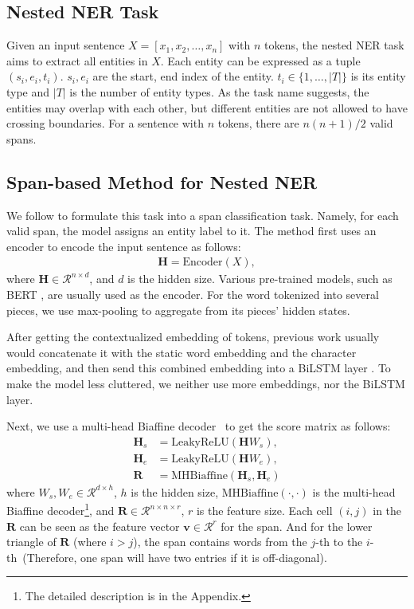 \documentclass[11pt]{article}
\begin{document}
\subsection{Nested NER Task}
Given an input sentence $X=[x_1, x_2, \ldots, x_n]$ with $n$ tokens, 
the nested NER task aims to extract all entities in $X$. Each entity can be expressed as a tuple $(s_i, e_i, t_i)$. $s_i, e_i$ are the start, end index of the entity. $t_i \in \{1, \ldots, |T|\}$ is its entity type and $|T|$ is the number of entity types. 
As the task name suggests, the entities may overlap with each other, but different entities are not allowed to have crossing boundaries. For a sentence with $n$ tokens, there are $n(n+1)/2$ valid spans. 

\subsection{Span-based Method for Nested NER}
We follow \citet{DBLP:conf/acl/YuBP20} to formulate this task into a span classification task. Namely, for each valid span, the model assigns an entity label to it. The method first uses an encoder to encode the input sentence as follows:
\begin{align}
  \mathbf{H} = \mathrm{Encoder}(X), \nonumber
\end{align}
where $\mathbf{H} \in \mathcal{R}^{n \times d}$, and $d$ is the hidden size. Various pre-trained models, such as BERT \cite{DBLP:conf/naacl/DevlinCLT19}, are usually used as the encoder. For the word tokenized into several pieces, we use max-pooling to aggregate from its pieces' hidden states.

After getting the contextualized embedding of tokens, previous work usually would concatenate it with the static word embedding and the character embedding, and then send this combined embedding into a BiLSTM layer \cite{DBLP:conf/acl/YuBP20,DBLP:conf/acl/WanR0022,DBLP:conf/acl/0002THH22}. To make the model less cluttered, we neither use more embeddings, nor the BiLSTM layer. 

Next, we use a multi-head Biaffine decoder~\cite{DBLP:conf/iclr/DozatM17,DBLP:conf/nips/VaswaniSPUJGKP17} to get the score matrix as follows:
\begin{align}
  \mathbf{H}_s & = \mathrm{LeakyReLU}(\mathbf{H}W_s), \nonumber \\
  \mathbf{H}_e & = \mathrm{LeakyReLU}(\mathbf{H}W_e),  \nonumber \\
  \mathbf{R} & = \mathrm{MHBiaffine}(\mathbf{H}_s, \mathbf{H}_e) \nonumber
\end{align}
where $W_s,W_e \in \mathcal{R}^{d \times h}$, $h$ is the hidden size, $\mathrm{MHBiaffine}(\cdot, \cdot)$ is the multi-head Biaffine decoder\footnote{The detailed description is in the Appendix.}, and $\mathbf{R} \in \mathcal{R}^{n \times n \times r }$, $r$ is the feature size. Each cell $(i, j)$ in the $\mathbf{R}$ can be seen as the feature vector $\mathbf{v} \in \mathcal{R}^r$ for the span. And for the lower triangle of $\mathbf{R}$ (where $i>j$), the span contains words from the $j$-th to the $i$-th~(Therefore, one span will have two entries if it is off-diagonal).
\end{document}
